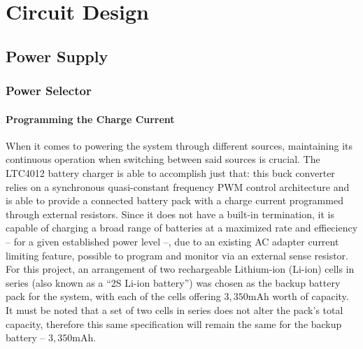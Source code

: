 

\section{Circuit Design}\label{sec:32_Circuit}


\subsection{Power Supply}\label{sec:321_POWERSUPPLY}

\subsubsection{Power Selector}\label{sec:3211_LTC4012}

\paragraph{Programming the Charge Current}	When it comes to powering the system through different sources, maintaining its continuous operation when switching between said sources is crucial. The LTC4012 battery charger is able to accomplish just that: this buck converter relies on a synchronous quasi-constant frequency \gls{PWM} control architecture and is able to provide a connected battery pack with a charge current programmed through external resistors. Since it does not have a built-in termination, it is capable of charging a broad range of batteries at a maximized rate and effieciency -- for a given established power level --, due to an existing \gls{AC} adapter current limiting feature, possible to program and monitor via an external sense resistor. For this project, an arrangement of two rechargeable Lithium-ion (Li-ion) cells in series (also known as a ``2S Li-ion battery'') was chosen as the backup battery pack for the system, with each of the cells offering $3,350$mAh worth of capacity. It must be noted that a set of two cells in series does not alter the pack's total capacity, therefore this same specification will remain the same for the backup battery -- $3,350$mAh.

